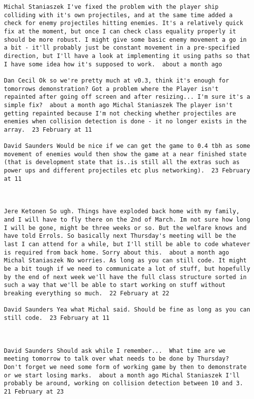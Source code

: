 \begin{verbatim}
Michal Staniaszek I've fixed the problem with the player ship
colliding with it's own projectiles, and at the same time added a
check for enemy projectiles hitting enemies. It's a relatively quick
fix at the moment, but once I can check class equality properly it
should be more robust. I might give some basic enemy movement a go in
a bit - it'll probably just be constant movement in a pre-specified
direction, but I'll have a look at implementing it using paths so that
I have some idea how it's supposed to work.  about a month ago

Dan Cecil Ok so we're pretty much at v0.3, think it's enough for
tomorrows demonstration? Got a problem where the Player isn't
repainted after going off screen and after resizing... I'm sure it's a
simple fix?  about a month ago Michal Staniaszek The player isn't
getting repainted because I'm not checking whether projectiles are
enemies when collision detection is done - it no longer exists in the
array.  23 February at 11

David Saunders Would be nice if we can get the game to 0.4 tbh as some
movement of enemies would then show the game at a near finished state
(that is development state that is..is still all the extras such as
power ups and different projectiles etc plus networking).  23 February
at 11



Jere Ketonen So ugh. Things have exploded back home with my family,
and I will have to fly there on the 2nd of March. Im not sure how long
I will be gone, might be three weeks or so. But the welfare knows and
have told Errols. So basically next Thursday's meeting will be the
last I can attend for a while, but I'll still be able to code whatever
is required from back home. Sorry about this.  about a month ago
Michal Staniaszek No worries. As long as you can still code. It might
be a bit tough if we need to communicate a lot of stuff, but hopefully
by the end of next week we'll have the full class structure sorted in
such a way that we'll be able to start working on stuff without
breaking everything so much.  22 February at 22

David Saunders Yea what Michal said. Should be fine as long as you can
still code.  23 February at 11



David Saunders Should ask while I remember...  What time are we
meeting tomorrow to talk over what needs to be done by Thursday?
Don't forget we need some form of working game by then to demonstrate
or we start losing marks.  about a month ago Michal Staniaszek I'll
probably be around, working on collision detection between 10 and 3.
21 February at 23




\end{verbatim}
